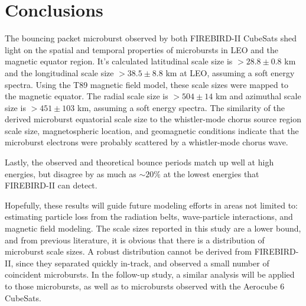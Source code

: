 \documentclass[draft,linenumbers]{agujournal}
\begin{document}

\section{Conclusions}
The bouncing packet microburst observed by both FIREBIRD-II CubeSats shed light on the spatial and temporal properties of microbursts in LEO and the magnetic equator region. It's calculated latitudinal scale size is $ > 28.8 \pm 0.8$ km and the longitudinal scale size $ > 38.5 \pm 8.8$ km at LEO, assuming a soft energy spectra. Using the T89 magnetic field model, these scale sizes were mapped to the magnetic equator. The radial scale size is $> 504 \pm​ 14$ km and azimuthal scale size is $> 451 \pm 103$ km, assuming a soft energy spectra. The similarity of the derived microburst equatorial scale size to the whistler-mode chorus source region scale size, magnetospheric location, and geomagnetic conditions indicate that the microburst electrons were probably scattered by a whistler-mode chorus wave.

Lastly, the observed and theoretical bounce periods match up well at high energies, but disagree by as much as $\sim 20 \%$ at the lowest energies that FIREBIRD-II can detect.

Hopefully, these results will guide future modeling efforts in areas not limited to: estimating particle loss from the radiation belts, wave-particle interactions, and magnetic field modeling. The scale sizes reported in this study are a lower bound, and from previous literature, it is obvious that there is a distribution of microburst scale sizes. A robust distribution cannot be derived from FIREBIRD-II, since they separated quickly in-track, and observed a small number of coincident microbursts. In the follow-up study, a similar analysis will be applied to those microbursts, as well as to microbursts observed with the Aerocube 6 CubeSats.




\end{document}
